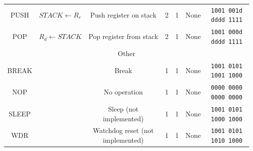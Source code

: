 \documentclass[11pt]{article}
\begin{document}
\begin{center}
\begin{longtable}{|c|m{12em}|c|c|c|c|c|}
PUSH & $STACK \leftarrow R_r$ & Push register on stack & 2 & 1 & None & \texttt{1001 001d dddd 1111}\\
POP & $R_d \leftarrow STACK$ & Pop register from stack & 2 & 1 & None & \texttt{1001 000d dddd 1111}\\
\hline\hline
\multicolumn{7}{|c|}{Other} \\
\hline
BREAK &  &  Break & 1 & 1 & None & \texttt{1001 0101 1001 1000}\\
NOP &  &  No operation & 1 & 1 & None & \texttt{0000 0000 0000 0000}\\
SLEEP &  & Sleep (not implemented) & 1 & 1 & None & \texttt{1001 0101 1000 1000}\\
WDR &  & Watchdog reset (not implemented) & 1 & 1 & None & \texttt{1001 0101 1010 1000}\\
\hline
\end{longtable}
\end{center}
\end{document}
